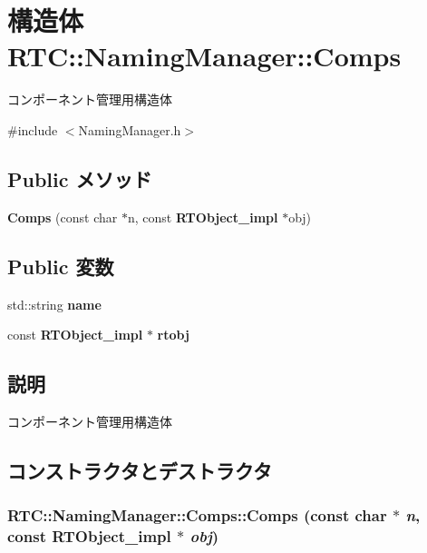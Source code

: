 \section{構造体 RTC::NamingManager::Comps}
\label{structRTC_1_1NamingManager_1_1Comps}


コンポーネント管理用構造体  




{\ttfamily \#include $<$NamingManager.h$>$}

\subsection*{Public メソッド}
\begin{DoxyCompactItemize}
\item 
{\bf Comps} (const char $\ast$n, const {\bf RTObject\_\-impl} $\ast$obj)
\end{DoxyCompactItemize}
\subsection*{Public 変数}
\begin{DoxyCompactItemize}
\item 
std::string {\bf name}
\item 
const {\bf RTObject\_\-impl} $\ast$ {\bf rtobj}
\end{DoxyCompactItemize}


\subsection{説明}
コンポーネント管理用構造体 

\subsection{コンストラクタとデストラクタ}
\subsubsection[{Comps}]{\setlength{\rightskip}{0pt plus 5cm}RTC::NamingManager::Comps::Comps (const char $\ast$ {\em n}, \/  const {\bf RTObject\_\-impl} $\ast$ {\em obj})\hspace{0.3cm}{\ttfamily  [inline]}}\label{structRTC_1_1NamingManager_1_1Comps_a8a7a45790b8e3f46fa8253d2e6104bf6}


